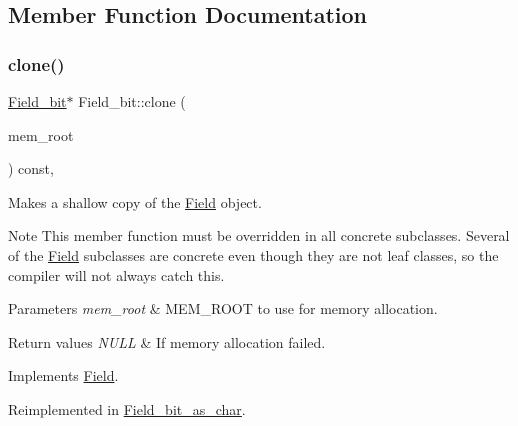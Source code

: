 \subsection{Member Function Documentation}
\mbox{\label{classField__bit_aeb78600782993f9f9b6eb5b24de2e527}} 
\subsubsection{\texorpdfstring{clone()}{clone()}\hspace{0.1cm}{\footnotesize\ttfamily [1/2]}}
{\footnotesize\ttfamily \mbox{\hyperlink{classField__bit}{Field\+\_\+bit}}$\ast$ Field\+\_\+bit\+::clone (\begin{DoxyParamCaption}\item[{M\+E\+M\+\_\+\+R\+O\+OT $\ast$}]{mem\+\_\+root }\end{DoxyParamCaption}) const\hspace{0.3cm}{\ttfamily [inline]}, {\ttfamily [virtual]}}

Makes a shallow copy of the \mbox{\hyperlink{classField}{Field}} object.

\begin{DoxyNote}{Note}
This member function must be overridden in all concrete subclasses. Several of the \mbox{\hyperlink{classField}{Field}} subclasses are concrete even though they are not leaf classes, so the compiler will not always catch this.
\end{DoxyNote}

\begin{DoxyParams}{Parameters}
{\em mem\+\_\+root} & M\+E\+M\+\_\+\+R\+O\+OT to use for memory allocation. \\
\hline
\end{DoxyParams}

\begin{DoxyRetVals}{Return values}
{\em N\+U\+LL} & If memory allocation failed. \\
\hline
\end{DoxyRetVals}


Implements \mbox{\hyperlink{classField_a64979bcb9345803b031fff76a0c3d9fe}{Field}}.



Reimplemented in \mbox{\hyperlink{classField__bit__as__char_ad4db0c25fbc5074baf6793daabfe5447}{Field\+\_\+bit\+\_\+as\+\_\+char}}.

